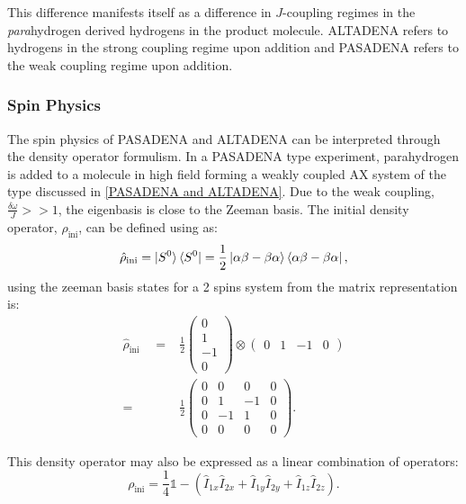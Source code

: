 This difference manifests itself as a difference in $J$-coupling regimes in the
\textit{para}hydrogen derived hydrogens in the product molecule. ALTADENA
refers to hydrogens in the strong coupling regime upon addition and PASADENA
refers to the weak coupling regime upon addition.


 \subsubsection{Spin Physics}

 The spin physics of PASADENA and ALTADENA can be interpreted through the density operator formulism. In a
 PASADENA type experiment, parahydrogen is added to a molecule in high field forming a weakly coupled AX
 system of the type discussed in \ref{PASADENA and ALTADENA}. Due to the weak coupling, $\frac{\delta{\omega}}{J}>>1$, the eigenbasis is close to the
 Zeeman basis. The initial density operator, $\hat{\rho}_{\text{ini}}$, can be defined using
  as:
 \begin{equation}
   \hat{\rho}_{\text{ini}} = \ket{S^0}\bra{S^0} = \frac{1}{2}\ket{\alpha\beta -
   \beta\alpha}\bra{\alpha\beta - \beta\alpha},
 \end{equation}
 using the zeeman basis states for a 2 spins system from  the
 matrix representation is:
 \begin{align}
   \hat{\rho}_{\text{ini}}\quad=& \frac{1}{2} \begin{pmatrix}
   0\\
   1\\
   -1\\
   0
   \end{pmatrix} \otimes \begin{pmatrix}
     0 & 1 & -1 & 0
     \end{pmatrix}\\
   =& \frac{1}{2}\begin{pmatrix}
   0 & 0 & 0 & 0\\
   0 & 1 & -1 & 0\\
   0 & -1 & 1 & 0\\
   0 & 0 & 0 & 0
 \end{pmatrix}.
 \end{align}

This density operator may also be expressed as a linear combination of operators:
\begin{equation}
  \rho_{\text{ini}} = \frac{1}{4}\mathbb{1} - (\hat{I}_{1x}\hat{I}_{2x} + \hat{I}_{1y}\hat{I}_{2y} + \hat{I}_{1z}\hat{I}_{2z}).
\end{equation}

